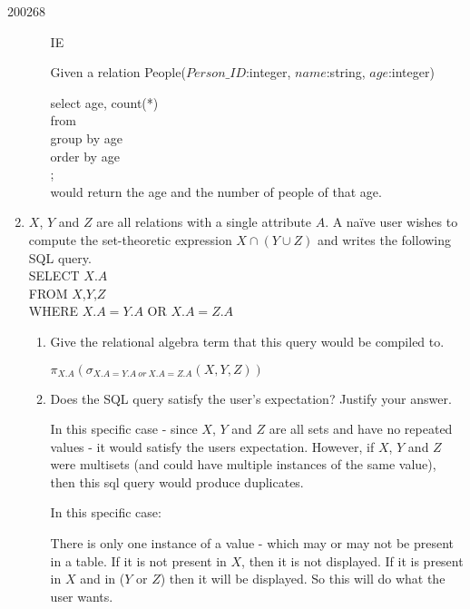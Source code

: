 \documentclass[10pt,\jkfside,a4paper]{article}
\begin{document}
\begin{examquestion}{2002}{6}{8}
\begin{enumerate}
\begin{enumerate}
IE

Given a relation People(\underline{$Person\_ID$}:integer, $name$:string, $age$:integer)

{\ttfamily 
select age, count(*)\\
from \\
group by age\\
order by age\\
;\\
}
would return the age and the number of people of that age.

\end{enumerate}
\item{$X$, $Y$ and $Z$ are all relations with a single attribute $A$. A na\"ive user wishes
to compute the set-theoretic expression $X \cap (Y \cup Z)$ and writes the following
SQL query.\\
SELECT $X.A$\\
FROM $X$,$Y$,$Z$\\
WHERE $X.A=Y.A$ OR $X.A=Z.A$}
\begin{enumerate}
\item{Give the relational algebra term that this query would be compiled to.}

$\pi_{X.A}(\sigma_{X.A=Y.A\ or\ X.A=Z.A}(X, Y, Z))$

\item{Does the SQL query satisfy the user’s expectation? Justify your answer.}

In this specific case - since $X$, $Y$ and $Z$ are all sets and have no repeated values - it would satisfy the users expectation. 
However, if $X$, $Y$ and $Z$ were multisets (and could have multiple instances of the same value), 
then this sql query would produce duplicates.

In this specific case:

There is only one instance of a value - which may or may not be present in a table.
If it is not present in $X$, then it is not displayed. If it is present in $X$ and in ($Y$ or $Z$) then it will be displayed. 
So this will do what the user wants.


\end{enumerate}
\end{enumerate}
\end{examquestion}
\end{document}
